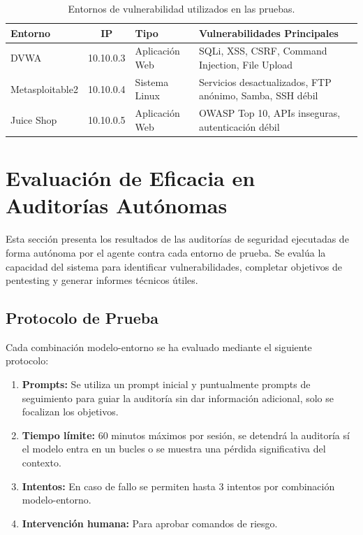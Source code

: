\begin{table}[H]
\centering
\renewcommand{\arraystretch}{1.2}
\begin{tabular}{|l|c|l|p{5cm}|}
\hline
\rowcolor[gray]{0.85}
\textbf{Entorno} & \textbf{IP} & \textbf{Tipo} & \textbf{Vulnerabilidades Principales} \\
\hline
DVWA & 10.10.0.3 & Aplicación Web & SQLi, XSS, CSRF, Command Injection, File Upload \\
\hline
Metasploitable2 & 10.10.0.4 & Sistema Linux & Servicios desactualizados, FTP anónimo, Samba, SSH débil \\
\hline
Juice Shop & 10.10.0.5 & Aplicación Web & OWASP Top 10, APIs inseguras, autenticación débil \\
\hline
\end{tabular}
\caption{Entornos de vulnerabilidad utilizados en las pruebas.}
\label{tab:entornos_vulnerabilidad}
\end{table}


\section{Evaluación de Eficacia en Auditorías Autónomas}
\label{sec:evaluacion_eficacia}

Esta sección presenta los resultados de las auditorías de seguridad ejecutadas de forma autónoma por el agente contra cada entorno de prueba. Se evalúa la capacidad del sistema para identificar vulnerabilidades, completar objetivos de pentesting y generar informes técnicos útiles.

\subsection{Protocolo de Prueba}

Cada combinación modelo-entorno se ha evaluado mediante el siguiente protocolo:

\begin{enumerate}
    \item \textbf{Prompts:} Se utiliza un prompt inicial y puntualmente prompts de seguimiento para guiar la auditoría sin dar información adicional, solo se focalizan los objetivos.
    \item \textbf{Tiempo límite:} 60 minutos máximos por sesión, se detendrá la auditoría sí el modelo entra en un bucles o se muestra una pérdida significativa del contexto.
    \item \textbf{Intentos:} En caso de fallo se permiten hasta 3 intentos por combinación modelo-entorno.
    \item \textbf{Intervención humana:} Para aprobar comandos de riesgo.
\end{enumerate}

